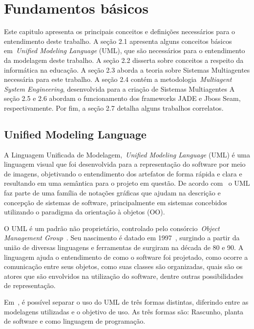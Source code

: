 \chapter{Fundamentos básicos}

Este capitulo apresenta os principais conceitos e definições necessários para o entendimento deste trabalho. A seção 2.1 apresenta alguns conceitos básicos em~\emph{Unified Modeling Language} (UML), que são necessários para o entendimento da modelagem deste trabalho.
A seção 2.2 disserta sobre conceitos a respeito da informática na educação.
A seção 2.3 aborda a teoria sobre Sistemas Multiagentes necessária para este trabalho.
A seção 2.4 contém a metodologia~\emph{Multiagent System Engineering}, desenvolvida para a criação de Sistemas Multiagentes
A seção 2.5 e 2.6 abordam o funcionamento dos frameworks JADE e Jboss Seam, respectivamente.
Por fim, a seção 2.7 detalha alguns trabalhos correlatos.

\section{Unified Modeling Language}

A Linguagem Unificada de Modelagem,~\emph{Unified Modeling Language} (UML) é uma linguagem visual que foi desenvolvida para a representação do software por meio de imagens, objetivando o entendimento dos artefatos de forma rápida e clara e resultando em uma semântica para o projeto em questão. De acordo com~\cite{fowler04} o UML faz parte de uma família de notações gráficas que ajudam na descrição e concepção de sistemas de software, principalmente em sistemas concebidos utilizando o paradigma da orientação à objetos (OO).

O UML é um padrão não proprietário, controlado pelo consórcio~\emph{Object Management Group}~\cite{omg20}. Seu nascimento é datado em 1997~\cite{fowler04}, surgindo a partir da união de diversas linguagens e ferramentas de surgiram na década de 80 e 90.
A linguagem ajuda o entendimento de como o software foi projetado, como ocorre a comunicação entre seus objetos, como suas classes são organizadas, quais são os atores que são envolvidos na utilização do software, dentre outras possibilidades de representação.

Em~\cite{fowler04}, é possível separar o uso do UML de três formas distintas, diferindo entre as modelagens utilizadas e o objetivo de uso. As três formas são: Rascunho, planta de software e como linguagem de programação. 


